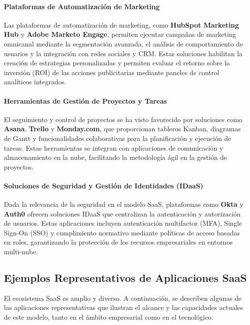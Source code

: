 {            \paragraph{Plataformas de Automatización de Marketing} Las plataformas de automatización de marketing, como \textbf{HubSpot Marketing Hub} y \textbf{Adobe Marketo Engage}, permiten ejecutar campañas de marketing omnicanal mediante la segmentación avanzada, el análisis de comportamiento de usuarios y la integración con redes sociales y CRM. Estas soluciones habilitan la creación de estrategias personalizadas y permiten evaluar el retorno sobre la inversión (ROI) de las acciones publicitarias mediante paneles de control analíticos integrados.
            
            \paragraph{Herramientas de Gestión de Proyectos y Tareas} El seguimiento y control de proyectos se ha visto favorecido por soluciones como \textbf{Asana}, \textbf{Trello} y \textbf{Monday.com}, que proporcionan tableros Kanban, diagramas de Gantt y funcionalidades colaborativas para la planificación y ejecución de tareas. Estas herramientas se integran con aplicaciones de comunicación y almacenamiento en la nube, facilitando la metodología ágil en la gestión de proyectos.
            
            \paragraph{Soluciones de Seguridad y Gestión de Identidades (IDaaS)} Dada la relevancia de la seguridad en el modelo SaaS, plataformas como \textbf{Okta} y \textbf{Auth0} ofrecen soluciones IDaaS que centralizan la autenticación y autorización de usuarios. Estas aplicaciones incluyen autenticación multifactor (MFA), Single Sign-On (SSO) y cumplimiento normativo mediante políticas de acceso basadas en roles, garantizando la protección de los recursos empresariales en entornos multi-nube.
            
        \subsection{Ejemplos Representativos de Aplicaciones SaaS}
            El ecosistema SaaS es amplio y diverso. A continuación, se describen algunas de las aplicaciones representativas que ilustran el alcance y las capacidades actuales de este modelo, tanto en el ámbito empresarial como en el tecnológico.
            
}
